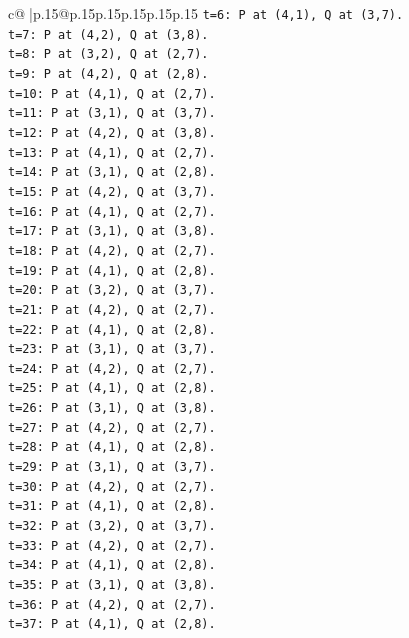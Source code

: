 \documentclass{article}
\begin{document}
{\begin{supertabular}{c@{$\;$}|p{.15\linewidth}@{}p{.15\linewidth}p{.15\linewidth}p{.15\linewidth}p{.15\linewidth}p{.15\linewidth}}
{{{\texttt{t=6: P at (4,1), Q at (3,7).} \\
\texttt{t=7: P at (4,2), Q at (3,8).} \\
\texttt{t=8: P at (3,2), Q at (2,7).} \\
\texttt{t=9: P at (4,2), Q at (2,8).} \\
\texttt{t=10: P at (4,1), Q at (2,7).} \\
\texttt{t=11: P at (3,1), Q at (3,7).} \\
\texttt{t=12: P at (4,2), Q at (3,8).} \\
\texttt{t=13: P at (4,1), Q at (2,7).} \\
\texttt{t=14: P at (3,1), Q at (2,8).} \\
\texttt{t=15: P at (4,2), Q at (3,7).} \\
\texttt{t=16: P at (4,1), Q at (2,7).} \\
\texttt{t=17: P at (3,1), Q at (3,8).} \\
\texttt{t=18: P at (4,2), Q at (2,7).} \\
\texttt{t=19: P at (4,1), Q at (2,8).} \\
\texttt{t=20: P at (3,2), Q at (3,7).} \\
\texttt{t=21: P at (4,2), Q at (2,7).} \\
\texttt{t=22: P at (4,1), Q at (2,8).} \\
\texttt{t=23: P at (3,1), Q at (3,7).} \\
\texttt{t=24: P at (4,2), Q at (2,7).} \\
\texttt{t=25: P at (4,1), Q at (2,8).} \\
\texttt{t=26: P at (3,1), Q at (3,8).} \\
\texttt{t=27: P at (4,2), Q at (2,7).} \\
\texttt{t=28: P at (4,1), Q at (2,8).} \\
\texttt{t=29: P at (3,1), Q at (3,7).} \\
\texttt{t=30: P at (4,2), Q at (2,7).} \\
\texttt{t=31: P at (4,1), Q at (2,8).} \\
\texttt{t=32: P at (3,2), Q at (3,7).} \\
\texttt{t=33: P at (4,2), Q at (2,7).} \\
\texttt{t=34: P at (4,1), Q at (2,8).} \\
\texttt{t=35: P at (3,1), Q at (3,8).} \\
\texttt{t=36: P at (4,2), Q at (2,7).} \\
\texttt{t=37: P at (4,1), Q at (2,8).} \\
}}}
\end{supertabular}}
\end{document}
